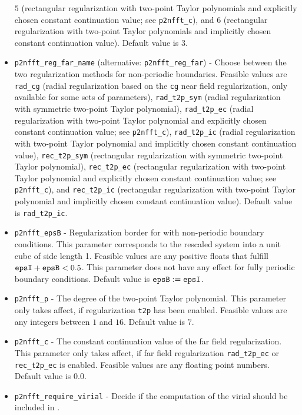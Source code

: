 \begin{itemize}
    $5$ (rectangular regularization with two-point Taylor polynomials and explicitly chosen constant continuation value; see \verb!p2nfft_c!), and
    $6$ (rectangular regularization with two-point Taylor polynomials and implicitly chosen constant continuation value). 
    Default value is $3$.
  \item \verb!p2nfft_reg_far_name! (alternative: \verb!p2nfft_reg_far!) -
    Choose between the two regularization methods for non-periodic boundaries. Feasible values are
    \verb!rad_cg!      (radial regularization based on the \verb!cg! near field regularization, only available for some sets of parameters),
    \verb!rad_t2p_sym! (radial regularization with symmetric two-point Taylor polynomial),
    \verb!rad_t2p_ec!  (radial regularization with two-point Taylor polynomial and explicitly chosen constant continuation value; see \verb!p2nfft_c!),
    \verb!rad_t2p_ic!  (radial regularization with two-point Taylor polynomial and implicitly chosen constant continuation value),
    \verb!rec_t2p_sym! (rectangular regularization with symmetric two-point Taylor polynomial),
    \verb!rec_t2p_ec!  (rectangular regularization with two-point Taylor polynomial and explicitly chosen constant continuation value; see \verb!p2nfft_c!), and
    \verb!rec_t2p_ic!  (rectangular regularization with two-point Taylor polynomial and implicitly chosen constant continuation value).
    Default value is \verb!rad_t2p_ic!.
  \item \verb!p2nfft_epsB! -
    Regularization border for \ptwonfft with non-periodic boundary conditions. This parameter corresponds to the rescaled system into a unit cube of side length 1.
    Feasible values are any positive floats that fulfill $\verb!epsI! + \verb!epsB! < 0.5$.
    This parameter does not have any effect for fully periodic boundary conditions. Default value is $\verb!epsB! := \verb!epsI!$.
  \item \verb!p2nfft_p! -
    The degree of the two-point Taylor polynomial. This parameter only takes affect, if regularization \verb!t2p! has been enabled.
    Feasible values are any integers between $1$ and $16$. Default value is $7$.
  \item \verb!p2nfft_c! -
    The constant continuation value of the far field regularization. This parameter only takes affect, if far field regularization \verb!rad_t2p_ec! or \verb!rec_t2p_ec! is enabled.
    Feasible values are any floating point numbers. Default value is $0.0$.
  \item \verb!p2nfft_require_virial! -
    Decide if the computation of the virial should be included in \ptwonfft.

\end{itemize}
